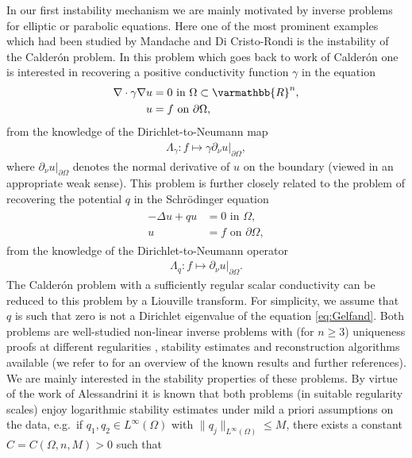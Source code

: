 \documentclass[12pt,twoside]{amsart}
\numberwithin{equation}{section}
\renewcommand{\leq}{\leqslant}
\renewcommand{\geq}{\geqslant}
\renewcommand{\mathbb}{\varmathbb}
\newcommand {\R} {\mathbb{R}} \newcommand {\Z} {\mathbb{Z}}
\newcommand {\p} {\partial}
\newcommand {\D} {\Delta}
\begin{document}
In our first instability mechanism we are mainly motivated by inverse problems for elliptic or parabolic equations. Here one of the most prominent examples which had been studied by Mandache \cite{Mandache} and Di Cristo-Rondi \cite{DiCristoRondi} is the instability of the Calder\'on problem. In this problem which goes back to work of Calder\'on \cite{Calderon} one is interested in recovering a positive conductivity function $\gamma$ in the equation
\begin{align}
\label{eq:Calderon}
\begin{split}
\nabla \cdot \gamma \nabla u &= 0 \mbox{ in } \Omega \subset \R^n,\\
u & = f \mbox{ on } \partial \Omega,
\end{split}
\end{align}
from the knowledge of the Dirichlet-to-Neumann map 
\begin{align*}
\Lambda_{\gamma}: f \mapsto \gamma \p_{\nu} u|_{\partial \Omega},
\end{align*}
where $\p_{\nu} u|_{\partial \Omega}$ denotes the normal derivative of $u$ on the boundary (viewed in an appropriate weak sense). This problem is further closely related to the problem of recovering the potential $q$ in the Schr\"odinger equation 
\begin{align}
\label{eq:Gelfand}
\begin{split}
-\D u + q u &= 0 \mbox{ in } \Omega, \\
u & = f \mbox{ on } \partial \Omega,
\end{split}
\end{align}
from the knowledge of the Dirichlet-to-Neumann operator
\begin{align*}
\Lambda_q: f \mapsto \partial_{\nu }u|_{\partial \Omega}.
\end{align*}
The Calder\'on problem with a sufficiently regular scalar conductivity can be reduced to this problem by a Liouville transform. For simplicity, we assume that $q$ is such that zero is not a Dirichlet eigenvalue of the equation \eqref{eq:Gelfand}.
Both problems are well-studied non-linear inverse problems with (for $n\geq 3$) uniqueness proofs at different regularities \cite{SylvesterUhlmann, Novikov, Chanillo, LavineNachman, Haberman_conductivity, Haberman_magnetic}, stability estimates \cite{Alessandrini} and reconstruction algorithms \cite{Nachman} available (we refer to \cite{Uhlmann_survey} for an overview of the known results and further references). We are mainly interested in the stability properties of these problems. By virtue of the work of Alessandrini \cite{Alessandrini} it is known that both problems (in suitable regularity scales) enjoy logarithmic stability estimates under mild a priori assumptions on the data, e.g.\ if $q_1, q_2\in L^{\infty}(\Omega)$ with $\|q_j\|_{L^{\infty}(\Omega)} \leq M$, there exists a constant $C = C(\Omega, n, M)>0$ such that
\end{document}
